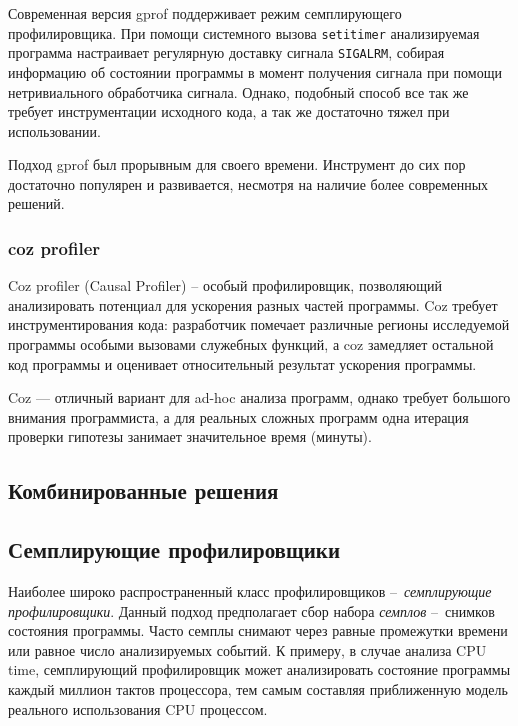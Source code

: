 Современная версия gprof поддерживает режим семплирующего профилировщика.
При помощи системного вызова \lstinline!setitimer! анализируемая программа настраивает регулярную доставку сигнала \lstinline!SIGALRM!, собирая информацию об состоянии программы в момент получения сигнала при помощи нетривиального обработчика сигнала. Однако, подобный способ все так же требует инструментации исходного кода, а так же достаточно тяжел при использовании.

Подход gprof был прорывным для своего времени.
Инструмент до сих пор достаточно популярен и развивается, несмотря на наличие более современных решений.


\subsubsection{coz profiler}
Coz profiler (Causal Profiler) \cite{coz:paper} – особый профилировщик, позволяющий анализировать потенциал
для ускорения разных частей программы.
Coz требует инструментирования кода: разработчик помечает различные регионы исследуемой программы особыми вызовами служебных функций,
а coz замедляет остальной код программы и оценивает относительный результат ускорения программы.

Coz --- отличный вариант для ad-hoc анализа программ, однако требует большого внимания программиста, а для реальных сложных программ
одна итерация проверки гипотезы занимает значительное время (минуты).

\subsection{Комбинированные решения}



\subsection{Семплирующие профилировщики}
Наиболее широко распространенный класс профилировщиков – \textit{семплирующие профилировщики}.
Данный подход предполагает сбор набора \textit{семплов} – снимков состояния программы.
Часто семплы снимают через равные промежутки времени или равное число анализируемых событий.
К примеру, в случае анализа CPU time, семплирующий профилировщик может анализировать состояние программы каждый миллион тактов процессора,
тем самым составляя приближенную модель реального использования CPU процессом.

